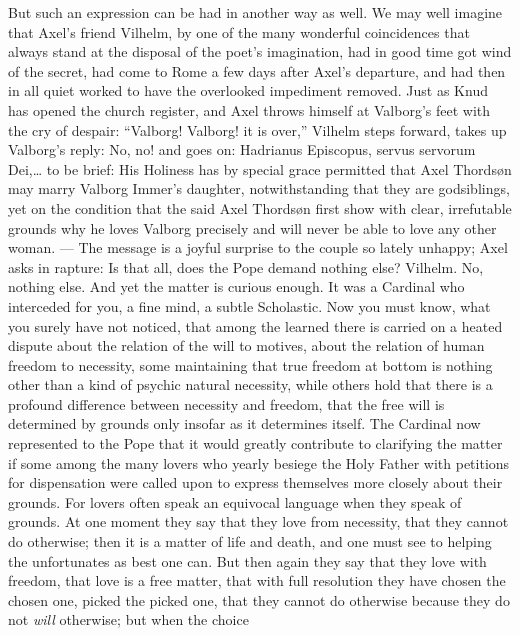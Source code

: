 \documentclass[12pt,a4paper,openany]{book}
\newcommand{\opage}[1]{\marginnote{\footnotesize\textit{[#1]}}}
\begin{document}
But such an expression can be had in another
way as well. We may well imagine that Axel's friend Vilhelm,
by one of the many wonderful coincidences that always
stand at the disposal of the poet's imagination, had in good time
got wind of the secret, had come to Rome
a few days after Axel's departure, and had then in all quiet
worked to have the overlooked impediment removed.
Just as Knud has opened the church register, and Axel throws himself
at Valborg's feet with the cry of despair:
``Valborg! Valborg! it is over,'' Vilhelm steps forward,
takes up Valborg's reply: No, no! and goes on: Hadrianus
Episcopus, servus servorum Dei,\dots{} to be brief:
His Holiness has by special grace permitted that Axel
\setcounter{footnote}{0}%
\opage{587}Thordsøn may marry Valborg Immer's daughter, notwithstanding that they
are godsiblings, yet on the condition that the said
Axel Thordsøn first show with clear, irrefutable grounds
why he loves Valborg precisely and will never
be able to love any other woman. --- The message is
a joyful surprise to the couple so lately unhappy;
Axel asks in rapture: Is that all,
does the Pope demand nothing else? Vilhelm. No, nothing else.
And yet the matter is curious enough. It was a
Cardinal who interceded for you, a fine mind, a
subtle Scholastic. Now you must know, what you surely
have not noticed, that among the learned there is carried on
a heated dispute about the relation of the will to motives,
about the relation of human freedom to necessity,
some maintaining that true freedom at bottom
is nothing other than a kind of psychic natural necessity,
while others hold that there is a profound
difference between necessity and freedom, that the free
will is determined by grounds only insofar as it determines
itself. The Cardinal now represented to the Pope that it
would greatly contribute to clarifying the matter if some
among the many lovers who yearly besiege
the Holy Father with petitions for dispensation were called upon
to express themselves more closely about their grounds. For lovers
often speak an equivocal language when they speak of grounds.
At one moment they say that they love from necessity, that they cannot
do otherwise; then it is a matter of life and death, and one must
see to helping the unfortunates as best one can.
But then again they say that they love with freedom, that love
is a free matter, that with full resolution they have
chosen the chosen one, picked the picked one, that they cannot
\setcounter{footnote}{0}%
\opage{588}do otherwise because they do not \emph{will} otherwise; but when the choice
\end{document}
